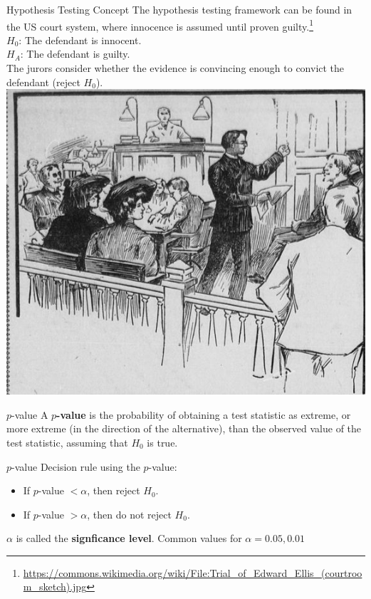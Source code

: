 \documentclass[fleqn, 11pt]{beamer}
\begin{document}
\begin{frame}{Hypothesis Testing Concept}
The hypothesis testing framework can be found in the US court system, where innocence is assumed until proven guilty.\footnote{\tiny \url{https://commons.wikimedia.org/wiki/File:Trial_of_Edward_Ellis_(courtroom_sketch).jpg}}\\
\vspace{5pt}
$H_0$:  The defendant is innocent.\\
$H_A$:  The defendant is guilty.\\
\vspace{5pt}
The jurors consider whether the evidence is convincing enough to convict the defendant (reject $H_0$).\\
\flushright
\includegraphics[scale=0.2]{figure/courtroom_sketch.jpg}
\end{frame}

\begin{frame}{$p$-value}
A \textbf{$p$-value} is the probability of obtaining a test statistic as extreme, or more extreme (in the direction of the alternative), than the observed value of the test statistic, assuming that $H_0$ is true.\\
\end{frame}

\begin{frame}{$p$-value}
Decision rule using the $p$-value:
\vspace{5pt}
\begin{itemize}
\item If $p$-value $< \alpha$, then reject $H_0$.
\item If $p$-value $> \alpha$, then do not reject $H_0$.
\end{itemize}
\vspace{10pt}
$\alpha$ is called the \textbf{signficance level}.  Common values for $\alpha=0.05, 0.01$\\
\end{frame}
\end{document}
